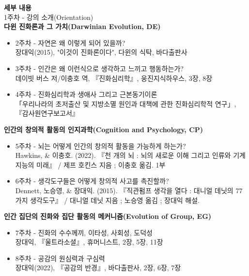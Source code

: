 \documentclass[11pt,letterpaper]{article}
\newcommand{\lefthead}[2]{\noindent\textbf{#1}\hfill\\[#2]}
\begin{document}
\newpage

\lefthead{세부 내용}{0.3cm}
1주차 - 강의 소개(Orientation) \\

\noindent \textbf{다윈 진화론과 그 가치(Darwinian Evolution, DE)}
        \begin{itemize}
        \item 2주차 - 자연은 왜 이렇게 되어 있을까? \\
        장대익(2015), "이것이 진화론이다", 다윈의 식탁, 바다출판사
        \item 3주차 - 인간은 왜 이런식으로 생각하고 느끼고 행동하는가? \\
        데이빗 버스 저/이충호 역, 『진화심리학』, 웅진지식하우스, 3장, 8장
        \item 4주차 - 진화심리학과 생애사 그리고 근본동기이론 \\
		「우리나라의 초저출산 및 지방소멸 원인과 대책에 관한 진화심리학적 연구」, 『감사원연구보고서』
		\end{itemize} \vspace{0.3cm}		
\noindent \textbf{인간의 창의적 활동의 인지과학(Cognition and Psychology, CP)}
        \begin{itemize}
        \item 5주차 - 뇌는 어떻게 인간의 창의적 활동을 가능하게 하는가? \\
        Hawkins, \& 이충호. (2022). 『천 개의 뇌 : 뇌의 새로운 이해 그리고 인류와 기계 지능의 미래』 / 제프 호킨스 지음 ; 이충호 옮김. 1부
        \item 6주차 - 생각도구들은 어떻게 창의적 사고를 촉진할까? \\
		Dennett, 노승영, \& 장대익. (2015). 『직관펌프 생각을 열다 : 대니얼 데닛의 77가지 생각도구』 / 대니얼 데닛 지음 ; 노승영 옮김 ; 장대익 해설. 
		\end{itemize} \vspace{0.3cm}	
\noindent \textbf{인간 집단의 진화와 집단 활동의 메커니즘(Evolution of Group, EG)}
        \begin{itemize}
        \item  7주차 - 진화의 수수께끼, 이타성, 사회성, 도덕성 \\
		장대익, 『울트라소셜』, 휴머니스트, 2장, 5장, 11장
        \item 8주차 - 공감의 원심력과 구심력 \\
        장대익(2022), 『공감의 반경』, 바다출판사, 2장, 6장, 7장
		\end{itemize} \vspace{0.3cm}
\end{document}
